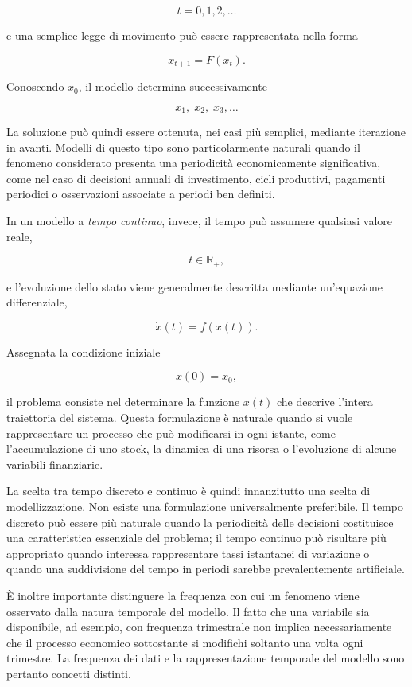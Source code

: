 \documentclass{book}
\begin{document}
$$
t=0,1,2,\ldots
$$

e una semplice legge di movimento può essere rappresentata nella forma

$$
x_{t+1}=F(x_t).
$$

Conoscendo $x_0$, il modello determina successivamente

$$
x_1,\;x_2,\;x_3,\ldots
$$

La soluzione può quindi essere ottenuta, nei casi più semplici, mediante iterazione in avanti. Modelli di questo tipo sono particolarmente naturali quando il fenomeno considerato presenta una periodicità economicamente significativa, come nel caso di decisioni annuali di investimento, cicli produttivi, pagamenti periodici o osservazioni associate a periodi ben definiti.

In un modello a \emph{tempo continuo}, invece, il tempo può assumere qualsiasi valore reale,

$$
t\in\mathbb{R}_{+},
$$

e l'evoluzione dello stato viene generalmente descritta mediante un'equazione differenziale,

$$
\dot{x}(t)=f(x(t)).
$$

Assegnata la condizione iniziale

$$
x(0)=x_0,
$$

il problema consiste nel determinare la funzione $x(t)$ che descrive l'intera traiettoria del sistema. Questa formulazione è naturale quando si vuole rappresentare un processo che può modificarsi in ogni istante, come l'accumulazione di uno stock, la dinamica di una risorsa o l'evoluzione di alcune variabili finanziarie.

La scelta tra tempo discreto e continuo è quindi innanzitutto una scelta di modellizzazione. Non esiste una formulazione universalmente preferibile. Il tempo discreto può essere più naturale quando la periodicità delle decisioni costituisce una caratteristica essenziale del problema; il tempo continuo può risultare più appropriato quando interessa rappresentare tassi istantanei di variazione o quando una suddivisione del tempo in periodi sarebbe prevalentemente artificiale.

È inoltre importante distinguere la frequenza con cui un fenomeno viene osservato dalla natura temporale del modello. Il fatto che una variabile sia disponibile, ad esempio, con frequenza trimestrale non implica necessariamente che il processo economico sottostante si modifichi soltanto una volta ogni trimestre. La frequenza dei dati e la rappresentazione temporale del modello sono pertanto concetti distinti.
\end{document}
